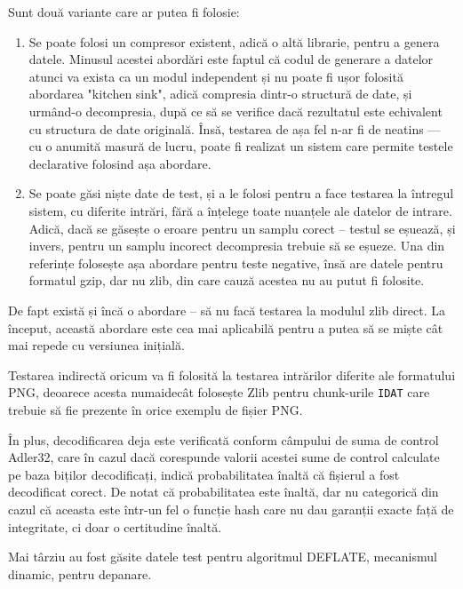 \documentclass[a4paper,12pt]{report}
\begin{document}
Sunt două variante care ar putea fi folosie:
\begin{enumerate}
    \item
        Se poate folosi un compresor existent, adică o altă librarie, pentru a genera datele.
        Minusul acestei abordări este faptul că codul de generare a datelor atunci va exista
        ca un modul independent și nu poate fi ușor folosită abordarea "kitchen sink", adică
        compresia dintr-o structură de date, și urmând-o decompresia, după ce să se verifice
        dacă rezultatul este echivalent cu structura de date originală.
        Însă, testarea de așa fel n-ar fi de neatins --- cu o anumită masură de lucru,
        poate fi realizat un sistem care permite testele declarative folosind așa abordare.
    \item
        Se poate găsi niște date de test, și a le folosi pentru a face testarea
        la întregul sistem, cu diferite intrări, fără a înțelege toate nuanțele ale datelor de intrare.
        Adică, dacă se găsește o eroare pentru un samplu corect -- testul se eșuează,
        și invers, pentru un samplu incorect decompresia trebuie să se eșueze.
        Una din referințe \cite{gzip_impl} folosește așa abordare pentru teste negative,
        însă are datele pentru formatul gzip, dar nu zlib, din care cauză acestea nu au putut fi folosite.
\end{enumerate}

De fapt există și încă o abordare -- să nu facă testarea la modulul zlib direct.
La început, această abordare este cea mai aplicabilă pentru a putea să se miște cât mai repede cu versiunea inițială.

Testarea indirectă oricum va fi folosită la testarea intrărilor diferite ale formatului \ac{PNG},
deoarece acesta numaidecât folosește Zlib pentru chunk-urile \texttt{IDAT} care trebuie să fie prezente
în orice exemplu de fișier \ac{PNG}.

În plus, decodificarea deja este verificată conform câmpului de suma de control Adler32,
care în cazul dacă corespunde valorii acestei sume de control calculate pe baza biților decodificați,
indică probabilitatea înaltă că fișierul a fost decodificat corect. 
De notat că probabilitatea este înaltă, dar nu categorică din cazul
că aceasta este într-un fel o funcție hash care nu dau garanții
exacte față de integritate, ci doar o certitudine înaltă.

Mai târziu au fost găsite datele test pentru algoritmul DEFLATE,
mecanismul dinamic, pentru depanare\cite{deflate_tests}.
\end{document}
